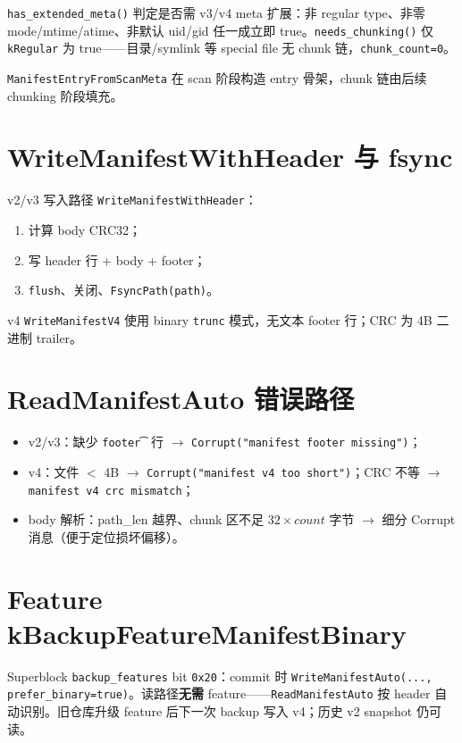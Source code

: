 \texttt{has\_extended\_meta()} 判定是否需 v3/v4 meta 扩展：非 regular type、非零 mode/mtime/atime、非默认 uid/gid 任一成立即 true。\texttt{needs\_chunking()} 仅 \texttt{kRegular} 为 true——目录/symlink 等 special file 无 chunk 链，\texttt{chunk\_count=0}。

\texttt{ManifestEntryFromScanMeta} 在 scan 阶段构造 entry 骨架，chunk 链由后续 chunking 阶段填充。

\section{WriteManifestWithHeader 与 fsync}

v2/v3 写入路径 \texttt{WriteManifestWithHeader}：
\begin{enumerate}[nosep]
  \item 计算 body CRC32；
  \item 写 header 行 + body + footer；
  \item \texttt{flush}、关闭、\texttt{FsyncPath(path)}。
\end{enumerate}

v4 \texttt{WriteManifestV4} 使用 binary \texttt{trunc} 模式，无文本 footer 行；CRC 为 4B 二进制 trailer。

\section{ReadManifestAuto 错误路径}

\begin{itemize}[nosep]
  \item v2/v3：缺少 \texttt{footer\t} 行 $\rightarrow$ \texttt{Corrupt("manifest footer missing")}；
  \item v4：文件 $<$ 4B $\rightarrow$ \texttt{Corrupt("manifest v4 too short")}；CRC 不等 $\rightarrow$ \texttt{manifest v4 crc mismatch}；
  \item body 解析：path\_len 越界、chunk 区不足 $32\times count$ 字节 $\rightarrow$ 细分 Corrupt 消息（便于定位损坏偏移）。
\end{itemize}

\section{Feature kBackupFeatureManifestBinary}

Superblock \texttt{backup\_features} bit \texttt{0x20}：commit 时 \texttt{WriteManifestAuto(..., prefer\_binary=true)}。读路径\textbf{无需} feature——\texttt{ReadManifestAuto} 按 header 自动识别。旧仓库升级 feature 后下一次 backup 写入 v4；历史 v2 snapshot 仍可读。

